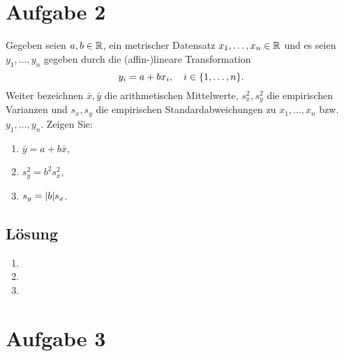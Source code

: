 \documentclass{exercise}
\begin{document}
    \section*{Aufgabe 2}

    \begin{problem}
        Gegeben seien \(a, b \in \mathbb{R}\), ein metrischer Datensatz \(x_1, \ldots, x_n \in \mathbb{R}\) und es seien \(y_1, \ldots, y_n\) gegeben durch die (affin-)lineare Transformation
        \[
            y_i = a + bx_i, \quad i \in \braces*{1, \ldots, n}.
        \]
        Weiter bezeichnen \(\bar{x}, \bar{y}\) die arithmetischen Mittelwerte, \(s_x^2, s_y^2\) die empirischen Varianzen und \(s_x, s_y\) die empirischen Standardabweichungen zu \(x_1, \ldots, x_n\) bzw. \(y_1, \ldots, y_n\).
        Zeigen Sie:
        \begin{enumerate}
            \item \(\bar{y} = a + b\bar{x}\),
            \item \(s_y^2 = b^2 s_x^2\),
            \item \(s_y = \absolute*{b}s_x\). 
        \end{enumerate}
    \end{problem}

    \subsection*{Lösung}
    \begin{enumerate}
        \item
        \item
        \item
    \end{enumerate}


    \section*{Aufgabe 3}
\end{document}
